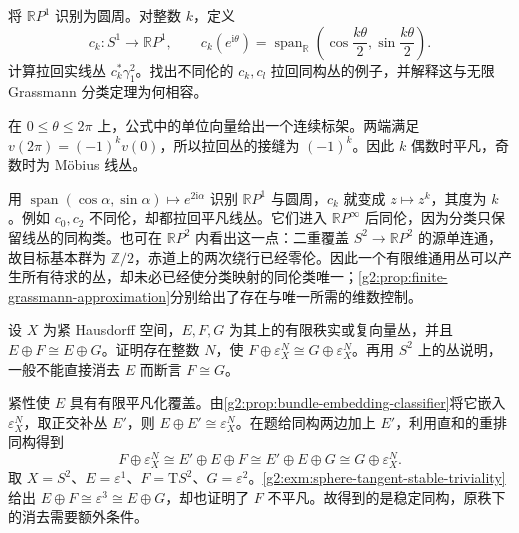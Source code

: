 \begin{exercise}\label{g2:ex:finite-line-classifier-parity}
	将 \(\mathbb RP^1\) 识别为圆周。对整数 \(k\)，定义
	\[
		c_k:S^1\longrightarrow\mathbb RP^1,\qquad
		c_k(e^{\mathrm i\theta})=
		\operatorname{span}_{\mathbb R}
		\left(\cos\frac{k\theta}{2},\sin\frac{k\theta}{2}\right).
	\]
	计算拉回实线丛 \(c_k^*\gamma_1^2\)。找出不同伦的 \(c_k,c_l\) 拉回同构丛的例子，并解释这与无限 Grassmann 分类定理为何相容。
\end{exercise}
\begin{solution}
	在 \(0\le\theta\le2\pi\) 上，公式中的单位向量给出一个连续标架。两端满足 \(v(2\pi)=(-1)^kv(0)\)，所以拉回丛的接缝为 \((-1)^k\)。因此 \(k\) 偶数时平凡，奇数时为 Möbius 线丛。

	用 \(\operatorname{span}(\cos\alpha,\sin\alpha)\mapsto e^{2\mathrm i\alpha}\) 识别 \(\mathbb RP^1\) 与圆周，\(c_k\) 就变成 \(z\mapsto z^k\)，其度为 \(k\)。例如 \(c_0,c_2\) 不同伦，却都拉回平凡线丛。它们进入 \(\mathbb RP^\infty\) 后同伦，因为分类只保留线丛的同构类。也可在 \(\mathbb RP^2\) 内看出这一点：二重覆盖 \(S^2\to\mathbb RP^2\) 的源单连通，故目标基本群为 \(\mathbb Z/2\)，赤道上的两次绕行已经零伦。因此一个有限维通用丛可以产生所有待求的丛，却未必已经使分类映射的同伦类唯一；\cref{g2:prop:finite-grassmann-approximation}分别给出了存在与唯一所需的维数控制。
\end{solution}

\begin{exercise}\label{g2:ex:stable-cancellation-with-complement}
	设 \(X\) 为紧 Hausdorff 空间，\(E,F,G\) 为其上的有限秩实或复向量丛，并且 \(E\oplus F\cong E\oplus G\)。证明存在整数 \(N\)，使 \(F\oplus\varepsilon_X^N\cong G\oplus\varepsilon_X^N\)。再用 \(S^2\) 上的丛说明，一般不能直接消去 \(E\) 而断言 \(F\cong G\)。
\end{exercise}
\begin{solution}
	紧性使 \(E\) 具有有限平凡化覆盖。由\cref{g2:prop:bundle-embedding-classifier}将它嵌入 \(\varepsilon_X^N\)，取正交补丛 \(E'\)，则 \(E\oplus E'\cong\varepsilon_X^N\)。在题给同构两边加上 \(E'\)，利用直和的重排同构得到
	\[
		F\oplus\varepsilon_X^N
		\cong E'\oplus E\oplus F
		\cong E'\oplus E\oplus G
		\cong G\oplus\varepsilon_X^N.
	\]
	取 \(X=S^2\)、\(E=\varepsilon^1\)、\(F=\mathrm TS^2\)、\(G=\varepsilon^2\)。\cref{g2:exm:sphere-tangent-stable-triviality}给出 \(E\oplus F\cong\varepsilon^3\cong E\oplus G\)，却也证明了 \(F\) 不平凡。故得到的是稳定同构，原秩下的消去需要额外条件。
\end{solution}

